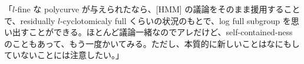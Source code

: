 「$l$-fine な polycurve が与えられたなら、[HMM] の議論をそのまま援用することで、residually $l$-cyclotomicaly full くらいの状況のもとで、log full subgroup を思い出すことができる。ほとんど議論一緒なのでアレだけど、self-contained-ness のこともあって、もう一度かいてみる。ただし、本質的に新しいことはなにもしていないことには注意したい。」